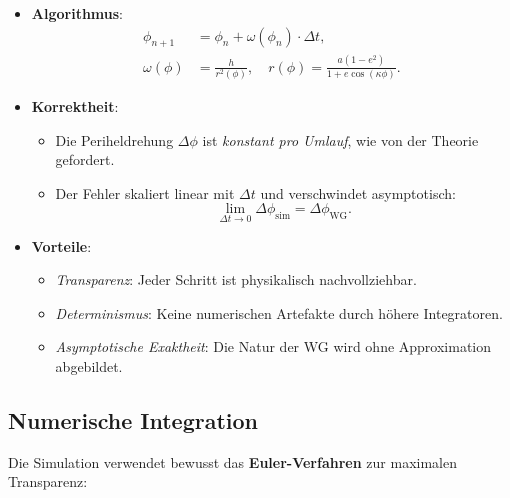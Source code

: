 \begin{itemize}
    \item \textbf{Algorithmus}:
    \begin{align*}
    \phi_{n+1} &= \phi_n + \omega(\phi_n) \cdot \Delta t, \\
    \omega(\phi) &= \frac{h}{r^2(\phi)}, \quad r(\phi) = \frac{a(1-e^2)}{1 + e \cos(\kappa \phi)}.
    \end{align*}

    \item \textbf{Korrektheit}:
    \begin{itemize}
        \item Die Periheldrehung $\Delta\phi$ ist \textit{konstant pro Umlauf}, wie von der Theorie gefordert.
        \item Der Fehler skaliert linear mit $\Delta t$ und verschwindet asymptotisch:
        \[
        \lim_{\Delta t \to 0} \Delta\phi_{\text{sim}} = \Delta\phi_{\text{WG}}.
        \]
    \end{itemize}

    \item \textbf{Vorteile}:
    \begin{itemize}
        \item \textit{Transparenz}: Jeder Schritt ist physikalisch nachvollziehbar.
        \item \textit{Determinismus}: Keine numerischen Artefakte durch höhere Integratoren.
        \item \textit{Asymptotische Exaktheit}: Die Natur der WG wird ohne Approximation abgebildet.
    \end{itemize}
\end{itemize}

\subsection{Numerische Integration}
Die Simulation verwendet bewusst das \textbf{Euler-Verfahren} zur maximalen Transparenz:

